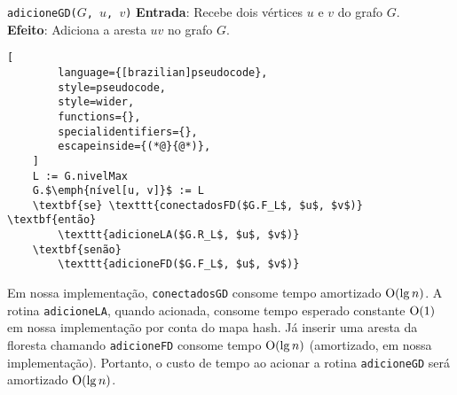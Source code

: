 \begin{programruledcaption}{\texttt{adicioneGD($G$, $u$, $v$)} \label{prog:addGD}}
    \noindent\textbf{Entrada}: Recebe dois vértices $u$ e $v$ do grafo $G$. \\
    \textbf{Efeito}: Adiciona a aresta $uv$ no grafo $G$.
    \vspace{-0.5\baselineskip}
    \begin{lstlisting}[
        language={[brazilian]pseudocode},
        style=pseudocode,
        style=wider,
        functions={},
        specialidentifiers={},
        escapeinside={(*@}{@*)},
    ]
    L := G.nivelMax
    G.$\emph{nível[u, v]}$ := L
    \textbf{se} \texttt{conectadosFD($G.F_L$, $u$, $v$)} \textbf{então}
        \texttt{adicioneLA($G.R_L$, $u$, $v$)}
    \textbf{senão}
        \texttt{adicioneFD($G.F_L$, $u$, $v$)}
    \end{lstlisting}
    \vspace{-0.5\baselineskip}
\end{programruledcaption}

\raggedbottom


Em nossa implementação, \texttt{conectadosGD} consome tempo amortizado $\mathrm{O}(\lg n)$. A rotina \texttt{adicioneLA}, quando acionada, consome tempo esperado constante $\mathrm{O}(1)$ em nossa implementação por conta do mapa hash. Já inserir uma aresta da floresta chamando \texttt{adicioneFD} consome tempo $\mathrm{O}(\lg n)$ (amortizado, em nossa implementação). Portanto, o custo de tempo ao acionar a rotina \texttt{adicioneGD} será amortizado $\mathrm{O}(\lg n)$.

